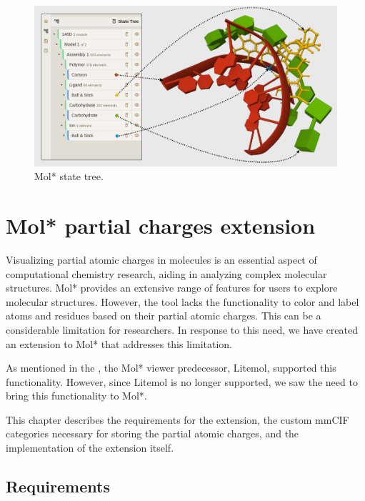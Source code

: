 \documentclass[
  digital,     %
  oneside,     %
  nosansbold,  %
  nocolorbold, %
  lof,         %
  lot,         %
]{fithesis4}
\begin{document}
\begin{figure}[htbp]
  \begin{center}
    \includegraphics[width=\textwidth]{figures/state_tree.png}
  \end{center}
  \caption{Mol* state tree.}
  \label{fig:state_tree}
\end{figure}

\newpage
\chapter{Mol* partial charges extension}
\label{chapter:molstar_partial_charges_extension}

Visualizing partial atomic charges in molecules is an essential aspect of computational chemistry research, aiding in analyzing complex molecular structures. Mol* provides an extensive range of features for users to explore molecular structures. However, the tool lacks the functionality to color and label atoms and residues based on their partial atomic charges.
This can be a considerable limitation for researchers. In response to this need, we have created an extension to Mol* that addresses this limitation.

As mentioned in the , the Mol* viewer predecessor, Litemol, supported this functionality. However, since Litemol is no longer supported, we saw the need to bring this functionality to Mol*.

This chapter describes the requirements for the extension, the custom mmCIF categories necessary for storing the partial atomic charges, and the implementation of the extension itself.

\section{Requirements}
\label{section:requirements}
\end{document}
